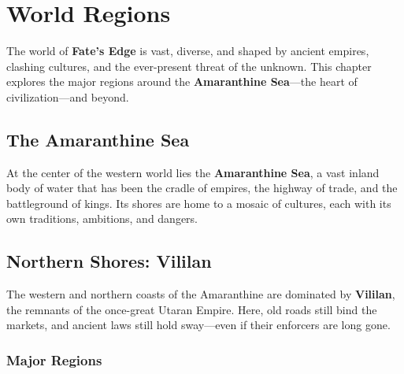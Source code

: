 
\chapter{World Regions}
\label{ch:world-regions}

The world of \textbf{Fate's Edge} is vast, diverse, and shaped by ancient empires, clashing cultures, and the ever-present threat of the unknown. This chapter explores the major regions around the \textbf{Amaranthine Sea}—the heart of civilization—and beyond.

\section{The Amaranthine Sea}

At the center of the western world lies the \textbf{Amaranthine Sea}, a vast inland body of water that has been the cradle of empires, the highway of trade, and the battleground of kings. Its shores are home to a mosaic of cultures, each with its own traditions, ambitions, and dangers.

\section{Northern Shores: Vililan}

The western and northern coasts of the Amaranthine are dominated by \textbf{Vililan}, the remnants of the once-great Utaran Empire. Here, old roads still bind the markets, and ancient laws still hold sway—even if their enforcers are long gone.

\subsection*{Major Regions}


